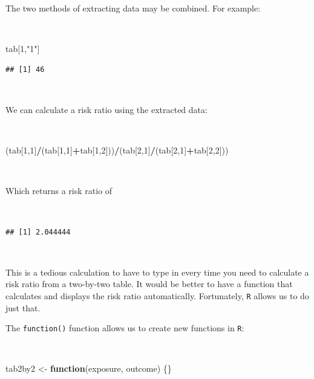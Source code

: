 \documentclass[12pt,a4paper]{book}
\newenvironment{Shaded}{\begin{snugshade}}{\end{snugshade}}
\newcommand{\DecValTok}[1]{\textcolor[rgb]{0.00,0.00,0.81}{#1}}
\newcommand{\StringTok}[1]{\textcolor[rgb]{0.31,0.60,0.02}{#1}}
\newcommand{\ControlFlowTok}[1]{\textcolor[rgb]{0.13,0.29,0.53}{\textbf{#1}}}
\newcommand{\OperatorTok}[1]{\textcolor[rgb]{0.81,0.36,0.00}{\textbf{#1}}}
\newcommand{\NormalTok}[1]{#1}
\theoremstyle{definition}
\theoremstyle{definition}
\theoremstyle{definition}
\theoremstyle{remark}
\begin{document}
\newpage

The two methods of extracting data may be combined. For example:

~

\begin{Shaded}
\begin{Highlighting}[]
\NormalTok{tab[}\DecValTok{1}\NormalTok{,}\StringTok{"1"}\NormalTok{]}
\end{Highlighting}
\end{Shaded}

\begin{verbatim}
## [1] 46
\end{verbatim}

~

We can calculate a risk ratio using the extracted data:

~

\begin{Shaded}
\begin{Highlighting}[]
\NormalTok{(tab[}\DecValTok{1}\NormalTok{,}\DecValTok{1}\NormalTok{]}\OperatorTok{/}\NormalTok{(tab[}\DecValTok{1}\NormalTok{,}\DecValTok{1}\NormalTok{]}\OperatorTok{+}\NormalTok{tab[}\DecValTok{1}\NormalTok{,}\DecValTok{2}\NormalTok{]))}\OperatorTok{/}\NormalTok{(tab[}\DecValTok{2}\NormalTok{,}\DecValTok{1}\NormalTok{]}\OperatorTok{/}\NormalTok{(tab[}\DecValTok{2}\NormalTok{,}\DecValTok{1}\NormalTok{]}\OperatorTok{+}\NormalTok{tab[}\DecValTok{2}\NormalTok{,}\DecValTok{2}\NormalTok{]))}
\end{Highlighting}
\end{Shaded}

~

Which returns a risk ratio of

~

\begin{verbatim}
## [1] 2.044444
\end{verbatim}

~

This is a tedious calculation to have to type in every time you need to
calculate a risk ratio from a two-by-two table. It would be better to
have a function that calculates and displays the risk ratio
automatically. Fortunately, \texttt{R} allows us to do just that.

The \texttt{function()} function allows us to create new functions in
\texttt{R}:

~

\begin{Shaded}
\begin{Highlighting}[]
\NormalTok{tab2by2 <-}\StringTok{ }\ControlFlowTok{function}\NormalTok{(exposure, outcome) \{\}}
\end{Highlighting}
\end{Shaded}
\end{document}

